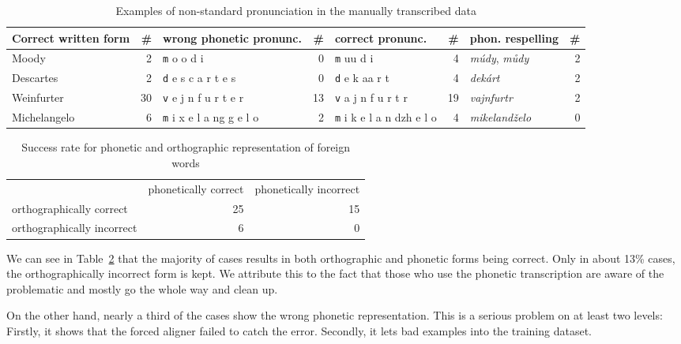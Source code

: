 \documentclass{itatnew}
\begin{document}
\begin{table}[htpb]
\begin{center}
\begin{tabular}{|l r|l r|l r|l r|}
\hline
Correct written form        & \#
	& wrong phonetic pronunc.   & \#
		& correct pronunc.          & \#
			& phon. respelling          & \# \\
\hline
Moody & 2 & {\texttt m o o d i} & 0 & {\texttt m uu d i} & 4 & {\em múdy}, {\em můdy} & 2 \\
Descartes & 2 & {\texttt d e s c a r t e s} & 0 & {\texttt d e k aa r t} & 4 & {\em dekárt} & 2   \\
Weinfurter & 30 & {\texttt v e j n f u r t e r} & 13 & {\texttt v a j n f u r t r} & 19 & {\em vajnfurtr} & 2 \\
Michelangelo & 6 & {\texttt m i x e l a ng g e l o} & 2 & {\texttt m i k e l a n dzh e l o} & 4 & {\em mikelandželo} & 0 \\
\hline
\end{tabular}
\caption{Examples of non-standard pronunciation in the manually transcribed data}\label{tab:pronunc}
\end{center}
\end{table}

\begin{table}[htpb]
\begin{center}
\begin{tabular}{|l|r|r|}
\hline
 & phonetically correct & phonetically incorrect \\
orthographically correct & 25 & 15 \\
orthographically incorrect & 6 & 0
\hline
\end{tabular}
\caption{Success rate for phonetic and orthographic representation of foreign
words}\label{tab:pronunc-rate}
\end{center}
\end{table}

We can see in Table~\ref{tab:pronunc-rate} that the majority of cases results in
both orthographic and phonetic forms being correct. Only in about 13\% cases,
the orthographically incorrect form is kept. We attribute this to the fact that
those who use the phonetic transcription are aware of the problematic and mostly
go the whole way and clean up.

On the other hand, nearly a third of the cases show the wrong phonetic
representation. This is a serious problem on at least two levels: Firstly, it
shows that the forced aligner failed to catch the error. Secondly, it lets bad
examples into the training dataset.
\end{document}
